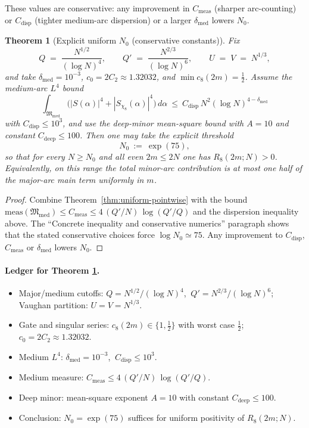 \documentclass[11pt]{article}
\newtheorem{theorem}{Theorem}
\theoremstyle{definition}
\theoremstyle{remark}
\begin{document}
These values are conservative: any improvement in $C_{\mathrm{meas}}$ (sharper arc-counting) or $C_{\mathrm{disp}}$ (tighter medium-arc dispersion) or a larger $\delta_{\mathrm{med}}$ lowers $N_0$.

\begin{theorem}[Explicit uniform $N_0$ (conservative constants)]\label{thm:explicit-N0}
Fix
\[
  Q\;=\;\frac{N^{1/2}}{(\log N)^4},\qquad Q'\;=\;\frac{N^{2/3}}{(\log N)^6},\qquad U\;=\;V\;=\;N^{1/3},
\]
and take $\delta_{\mathrm{med}}=10^{-3}$, $c_0=2C_2\approx 1.32032$, and $\min c_8(2m)=\tfrac12$. Assume the medium-arc $L^4$ bound
\[
\int_{\mathfrak M_{\mathrm{med}}}\big(|S(\alpha)|^4+|S_{\chi_8}(\alpha)|^4\big)\,d\alpha\ \le\ C_{\mathrm{disp}}\,N^2(\log N)^{4-\delta_{\mathrm{med}}}
\]
with $C_{\mathrm{disp}}\le 10^3$, and use the deep-minor mean-square bound with $A=10$ and constant $C_{\mathrm{deep}}\le 100$. Then one may take the explicit threshold
\[
  N_0\ :=\ \exp(75),
\]
so that for every $N\ge N_0$ and all even $2m\le 2N$ one has $R_8(2m;N)>0$. Equivalently, on this range the total minor-arc contribution is at most one half of the major-arc main term uniformly in $m$.
\end{theorem}

\begin{proof}
Combine Theorem~\ref{thm:uniform-pointwise} with the bound $\mathrm{meas}(\mathfrak M_{\mathrm{med}})\le C_{\mathrm{meas}}\le 4\,(Q'/N)\,\log(Q'/Q)$ and the dispersion inequality above. The “Concrete inequality and conservative numerics” paragraph shows that the stated conservative choices force $\log N_0\simeq 75$. Any improvement to $C_{\mathrm{disp}}$, $C_{\mathrm{meas}}$ or $\delta_{\mathrm{med}}$ lowers $N_0$.
\end{proof}

\paragraph{Ledger for Theorem \ref{thm:explicit-N0}.}
\begin{itemize}
  \item Major/medium cutoffs: $Q=N^{1/2}/(\log N)^4$, $\ Q'=N^{2/3}/(\log N)^6$; Vaughan partition: $U=V=N^{1/3}$.
  \item Gate and singular series: $c_8(2m)\in\{1,\tfrac12\}$ with worst case $\tfrac12$; $c_0=2C_2\approx 1.32032$.
  \item Medium $L^4$: $\delta_{\mathrm{med}}=10^{-3}$, $\ C_{\mathrm{disp}}\le 10^3$.
  \item Medium measure: $C_{\mathrm{meas}}\le 4\,(Q'/N)\,\log(Q'/Q)$.
  \item Deep minor: mean-square exponent $A=10$ with constant $C_{\mathrm{deep}}\le 100$.
  \item Conclusion: $N_0=\exp(75)$ suffices for uniform positivity of $R_8(2m;N)$.
\end{itemize}
\end{document}
